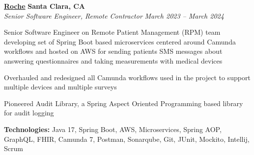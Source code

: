 %
    \headerrow
        {\textbf{\href{https://www.roche.com/}{Roche}}}
        {\textbf{Santa Clara, CA}}
    \\
    \headerrow
        {\emph{Senior Software Engineer, Remote Contractor}}
        {\emph{March 2023 -- March 2024}}
    \begin{itemize*}
        \item Senior Software Engineer on Remote Patient Management (RPM) team developing set of Spring Boot based microservices centered around Camunda workflows and hosted on AWS for sending patients SMS messages about answering questionnaires and taking measurements with medical devices
        \item Overhauled and redesigned all Camunda workflows used in the project to support multiple devices and multiple surveys
        \item Pioneered Audit Library, a Spring Aspect Oriented Programming based library for audit logging
    \end{itemize*}

    \hspace{1.0em}
        {\textbf{Technologies:} Java 17, Spring Boot, AWS, Microservices, Spring AOP, GraphQL, FHIR, Camunda 7, Postman, Sonarqube, Git, JUnit, Mockito, Intellij, Scrum}

